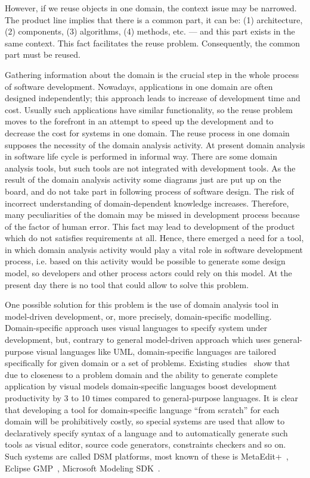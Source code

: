 \documentclass[conference]{IEEEtran}
\begin{document}
However, if we reuse objects in one domain, the context issue may be narrowed. The product line implies that there is a common part, it can be: (1) architecture, (2) components, (3) algorithms, (4) methods, etc. --- and this part exists in the same context. This fact facilitates the reuse problem. Consequently, the common part must be reused.

Gathering information about the domain is the crucial step in the whole process of software development. Nowadays, applications in one domain are often designed independently; this approach leads to increase of development time and cost. Usually such applications have similar functionality, so the reuse problem moves to the forefront in an attempt to speed up the development and to decrease the cost for systems in one domain. The reuse process in one domain supposes the necessity of the domain analysis activity. At present domain analysis in software life cycle is performed in informal way. There are some domain analysis tools, but such tools are not integrated with development tools. As the result of the domain analysis activity some diagrams just are put up on the board, and do not take part in following process of software design. The risk of incorrect understanding of domain-dependent knowledge increases. Therefore, many peculiarities of the domain may be missed in development process because of the factor of human error. This fact may lead to development of the product which do not satisfies requirements at all. Hence, there emerged a need for a tool, in which domain analysis activity would play a vital role in software development process, i.e. based on this activity would be possible to generate some design model, so developers and other process actors could rely on this model. At the present day there is no tool that could allow to solve this problem.   

One possible solution for this problem is the use of domain analysis tool in model-driven development, or, more precisely, domain-specific modelling. Domain-specific approach uses visual languages to specify system under development, but, contrary to general model-driven approach which uses general-purpose visual languages like UML, domain-specific languages are tailored specifically for given domain or a set of problems. Existing studies~\cite{tolvanen2016challenges,baker2005model,kieburtz1996software,kelly2000visual} show that due to closeness to a problem domain and the ability to generate complete application by visual models domain-specific languages boost development productivity by 3 to 10 times compared to general-purpose languages. It is clear that developing a tool for domain-specific language ``from scratch'' for each domain will be prohibitively costly, so special systems are used that allow to declaratively specify syntax of a language and to automatically generate such tools as visual editor, source code generators, constraints checkers and so on. Such systems are called DSM platforms, most known of these is MetaEdit+~\cite{tolvanen2007advanced,tolvanen2009metaedit,kelly2008domain}, Eclipse GMP~\cite{gronback2009eclipse,viyovic2014sirius}, Microsoft Modeling SDK~\cite{cook2007domain}.
\end{document}
